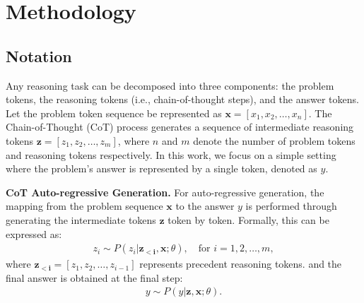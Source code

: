 
\section{Methodology}

\subsection{Notation}
Any reasoning task can be decomposed into three components: the problem tokens, the reasoning tokens (i.e., chain-of-thought steps), and the answer tokens. Let the problem token sequence be represented as \( \bm{x} = [x_1, x_2, \ldots, x_n] \). The Chain-of-Thought (CoT) process generates a sequence of intermediate reasoning tokens \( \bm{z} = [z_1, z_2, \ldots, z_m] \), where \( n \) and \( m \) denote the number of problem tokens and reasoning tokens respectively. In this work, we focus on a simple setting where the problem's answer is represented by a single token, denoted as \( y \). 

\textbf{CoT Auto-regressive Generation. } For auto-regressive generation, the mapping from the problem sequence \( \bm{x} \) to the answer \( y \) is performed through generating the intermediate tokens \( \bm{z} \) token by token. Formally, this can be expressed as:
\begin{align}
z_i \sim P(z_i|\bm{z_{<i}}, \bm{x}; \theta), \quad \text{for } i = 1, 2, \ldots, m,
\end{align}
where $\bm{z_{<i}}=[z_1, z_2, \ldots, z_{i-1}]$ represents precedent reasoning tokens. and the final answer is obtained at the final step:
\begin{align}
y \sim P(y|\bm{z},\bm{x};\theta).
\end{align}


